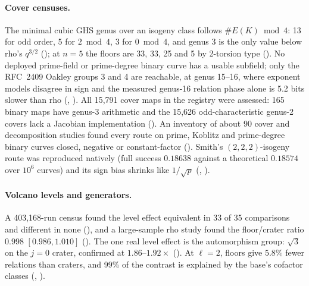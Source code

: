 \paragraph{Cover censuses.} The minimal cubic GHS genus over an isogeny
class follows $\#E(K)\bmod4$: 13 for odd order, 5 for $2\bmod4$, 3 for
$0\bmod4$, and genus 3 is the only value below rho's $q^{3/2}$
(); at $n=5$ the floors are
33, 33, 25 and 5 by 2-torsion type ().
No deployed prime-field or prime-degree binary curve has a usable subfield;
only the RFC~2409 Oakley groups 3 and 4 are reachable, at genus 15--16, where
exponent models disagree in sign and the measured genus-16 relation phase
alone is 5.2 bits slower than rho (,
). All 15{,}791 cover maps in the
registry were assessed: 165 binary maps have genus-3 arithmetic and the
15{,}626 odd-characteristic genus-2 covers lack a Jacobian implementation
(). An inventory of about
90 cover and decomposition studies found every route on prime, Koblitz and
prime-degree binary curves closed, negative or constant-factor
(). Smith's
$(2,2,2)$-isogeny route was reproduced natively (full success $0.18638$
against a theoretical $0.18574$ over $10^6$ curves) and its sign bias shrinks
like $1/\sqrt p$ (,
).

\paragraph{Volcano levels and generators.} A 403{,}168-run census found the
level effect equivalent in 33 of 35 comparisons and different in none
(), and a large-sample rho study
found the floor/crater ratio $0.998$ $[0.986,1.010]$
(). The one real level
effect is the automorphism group: $\sqrt3$ on the $j=0$ crater, confirmed at
$1.86$--$1.92\times$ ().
At $\ell=2$, floors give $5.8\%$ fewer relations than craters, and 99\% of the
contrast is explained by the base's cofactor classes
(,
).


